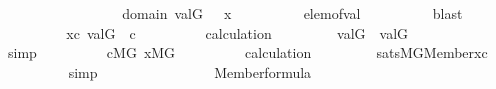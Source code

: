 \begin{isabellebody}
\ \ \ \ \ \ \isamarkupfalse%
\ {\isasymsigma}\ \isanewline
\ \ \ \ \ \ \ \ {\isachardoublequoteopen}{\isasymsigma}{\isasymin}domain{\isacharparenleft}{\kern0pt}{\isasymtau}{\isacharparenright}{\kern0pt}{\isachardoublequoteclose}\ {\isachardoublequoteopen}val{\isacharparenleft}{\kern0pt}G{\isacharcomma}{\kern0pt}{\isasymsigma}{\isacharparenright}{\kern0pt}\ {\isacharequal}{\kern0pt}\ \ x{\isachardoublequoteclose}\isanewline
\ \ \ \ \ \ \ \ \isamarkupfalse%
\ elem{\isacharunderscore}{\kern0pt}of{\isacharunderscore}{\kern0pt}val\isanewline
\ \ \ \ \ \ \ \ \isamarkupfalse%
\ blast\isanewline
\ \ \ \ \ \ \isamarkupfalse%
\ \isamarkupfalse%
\ {\isacartoucheopen}x{\isasymin}c{\isacartoucheclose}\ {\isacartoucheopen}val{\isacharparenleft}{\kern0pt}G{\isacharcomma}{\kern0pt}{\isasymchi}{\isacharparenright}{\kern0pt}\ {\isacharequal}{\kern0pt}\ c{\isacartoucheclose}\isanewline
\ \ \ \ \ \ \isamarkupfalse%
\ \isamarkupfalse%
\ calculation\ \isanewline
\ \ \ \ \ \ \isamarkupfalse%
\ {\isachardoublequoteopen}val{\isacharparenleft}{\kern0pt}G{\isacharcomma}{\kern0pt}{\isasymsigma}{\isacharparenright}{\kern0pt}\ {\isasymin}\ val{\isacharparenleft}{\kern0pt}G{\isacharcomma}{\kern0pt}{\isasymchi}{\isacharparenright}{\kern0pt}{\isachardoublequoteclose}\isanewline
\ \ \ \ \ \ \ \ \isamarkupfalse%
\ simp\isanewline
\ \ \ \ \ \ \isamarkupfalse%
\ \isamarkupfalse%
\ {\isacartoucheopen}c{\isasymin}M{\isacharbrackleft}{\kern0pt}G{\isacharbrackright}{\kern0pt}{\isacartoucheclose}\ {\isacartoucheopen}x{\isasymin}M{\isacharbrackleft}{\kern0pt}G{\isacharbrackright}{\kern0pt}{\isacartoucheclose}\isanewline
\ \ \ \ \ \ \isamarkupfalse%
\ \isamarkupfalse%
\ calculation\ \isanewline
\ \ \ \ \ \ \isamarkupfalse%
\ {\isachardoublequoteopen}sats{\isacharparenleft}{\kern0pt}M{\isacharbrackleft}{\kern0pt}G{\isacharbrackright}{\kern0pt}{\isacharcomma}{\kern0pt}Member{\isacharparenleft}{\kern0pt}{}{\isacharcomma}{\kern0pt}{}{\isacharparenright}{\kern0pt}{\isacharcomma}{\kern0pt}{\isacharbrackleft}{\kern0pt}x{\isacharcomma}{\kern0pt}c{\isacharbrackright}{\kern0pt}{\isacharparenright}{\kern0pt}{\isachardoublequoteclose}\isanewline
\ \ \ \ \ \ \ \ \isamarkupfalse%
\ simp\isanewline
\ \ \ \ \ \ \isamarkupfalse%
\ \isanewline
\ \ \ \ \ \ \isamarkupfalse%
\ {\isachardoublequoteopen}Member{\isacharparenleft}{\kern0pt}{}{\isacharcomma}{\kern0pt}{}{\isacharparenright}{\kern0pt}{\isasymin}formula{\isachardoublequoteclose}\ \isamarkupfalse%

\end{isabellebody}
